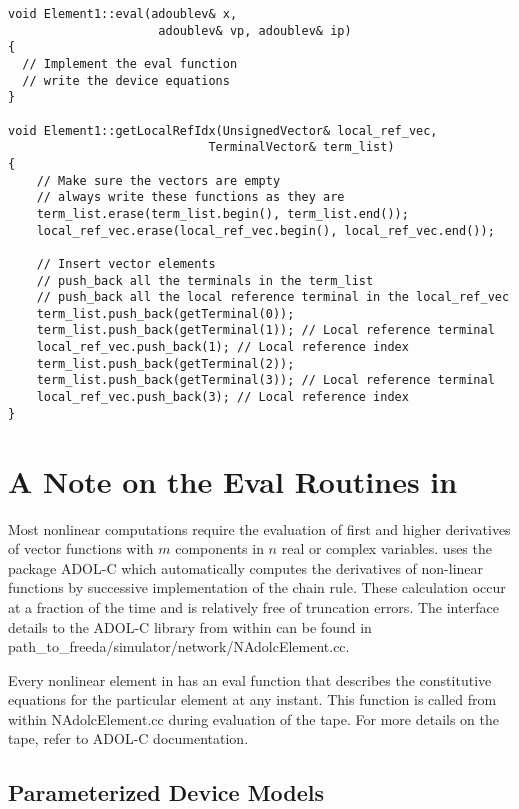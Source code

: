 \begin{lstlisting}[firstnumber=1, label={nonlinear:srcex},
    caption={Element1.cc}]
void Element1::eval(adoublev& x,
                     adoublev& vp, adoublev& ip)
{
  // Implement the eval function
  // write the device equations
}

void Element1::getLocalRefIdx(UnsignedVector& local_ref_vec,
                            TerminalVector& term_list)
{
    // Make sure the vectors are empty
    // always write these functions as they are
    term_list.erase(term_list.begin(), term_list.end());
    local_ref_vec.erase(local_ref_vec.begin(), local_ref_vec.end());

    // Insert vector elements
    // push_back all the terminals in the term_list
    // push_back all the local reference terminal in the local_ref_vec
    term_list.push_back(getTerminal(0));
    term_list.push_back(getTerminal(1)); // Local reference terminal
    local_ref_vec.push_back(1); // Local reference index
    term_list.push_back(getTerminal(2));
    term_list.push_back(getTerminal(3)); // Local reference terminal
    local_ref_vec.push_back(3); // Local reference index
}
\end{lstlisting}

\section{A Note on the Eval Routines in \FDA} \label{nonlinear:evalnote}

\noindent Most nonlinear computations require the evaluation of first and higher
derivatives of vector functions with $m$ components in $n$ real or complex
variables. \FDA uses the package ADOL-C which automatically
computes the derivatives of non-linear functions by successive implementation
of the chain rule. These calculation occur at a fraction of the time and is
relatively free of truncation errors. The interface details to the ADOL-C
library from within \FDA can be found in
path\_to\_freeda/simulator/network/NAdolcElement.cc.

Every nonlinear element in \FDA has an eval function that describes the
constitutive equations for the particular element at any instant. This
function is called from within NAdolcElement.cc during evaluation of the tape.
For more details on the tape, refer to ADOL-C documentation.

\subsection{Parameterized Device Models}

